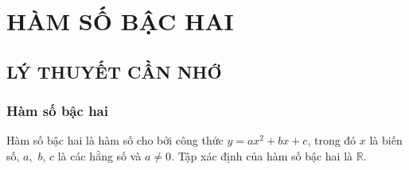 \setcounter{dang}{0}
\newpage
\setcounter{section}{1}
\section{HÀM SỐ BẬC HAI}
\subsection{LÝ THUYẾT CẦN NHỚ}
\subsubsection{Hàm số bậc hai}
\begin{boxdn}
	Hàm số bậc hai là hàm số cho bởi công thức $y = ax^2 + bx + c$,
	trong đó $x$ là biến số, $a,$ $b$, $c$ là các hằng số và $a \neq 0$.
	Tập xác định của hàm số bậc hai là $\mathbb{R}$.
\end{boxdn}

